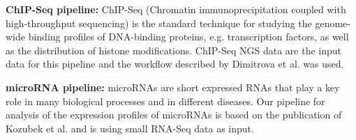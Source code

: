 \textbf{ChIP-Seq pipeline:} ChIP-Seq (Chromatin immunoprecipitation coupled with high-throughput sequencing) is the standard technique for studying the genome-wide binding profiles of DNA-binding proteins, e.g. transcription factors, as well as the distribution of histone modifications. ChIP-Seq NGS data are the input data for this pipeline and the workflow described by Dimitrova et al. \cite{dimitrova2014pax5} was used.

\textbf{microRNA pipeline:} microRNAs are short expressed RNAs that play a key role in many biological processes and in different diseases. Our pipeline for analysis of the expression profiles of microRNAs is based on the publication of Kozubek et al. \cite{kozubek2013depth} and is using small RNA-Seq data as input.




